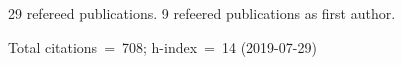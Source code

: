 29 refereed publications. 9 refeered publications as first author.

Total citations~=~708; h-index~=~14 (2019-07-29)